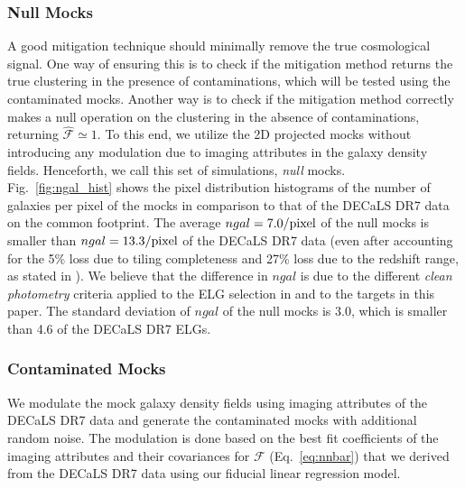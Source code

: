 \documentclass[fleqn, usenatbib]{mnras}
\begin{document}
\subsubsection{Null Mocks}
A good mitigation technique should minimally remove the true cosmological signal. One way of ensuring this is to check if the mitigation method returns the true clustering in the presence of contaminations, which will be tested using the contaminated mocks. Another way is to check if the mitigation method correctly makes a null operation on the clustering in the absence of contaminations, returning $\hat{\mathcal{F}}\simeq 1$. To this end, we utilize the 2D projected mocks without introducing any modulation due to imaging attributes in the galaxy density fields. Henceforth, we call this set of simulations, \textit{null} mocks.\\

Fig.~\ref{fig:ngal_hist} shows the pixel distribution histograms of the number of galaxies per pixel of the mocks in comparison to that of the DECaLS DR7 data on the common footprint. The average $ngal=7.0/{\rm pixel}$ of the null mocks is smaller than $ngal=13.3/{\rm pixel}$ of the DECaLS DR7 data (even after accounting for the 5\% loss due to tiling completeness and 27\% loss due to the redshift range, as stated in \citet{Raichoor2017MNRAS.471.3955R}). We believe that the difference in $ngal$ is due to the different \textit{clean photometry} criteria applied to the ELG selection in \citet{Raichoor2017MNRAS.471.3955R} and to the targets in this paper. The standard deviation of $ngal$ of the null mocks is 3.0, which is smaller than 4.6 of the DECaLS DR7 ELGs.

\subsubsection{Contaminated Mocks}
We modulate the mock galaxy density fields using imaging attributes of the DECaLS DR7 data and generate the contaminated mocks with additional random noise. The modulation is done based on the best fit coefficients of the imaging attributes and their covariances for $\mathcal{F}$ (Eq.~\ref{eq:nnbar}) that we derived from the DECaLS DR7 data using our fiducial linear regression model.\\
\end{document}
